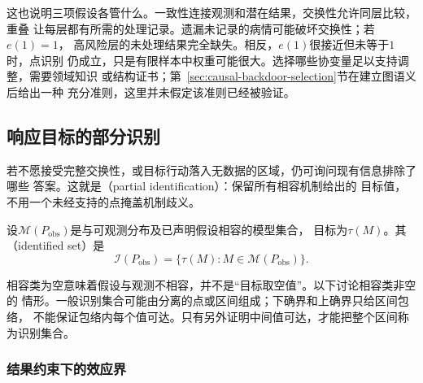 这也说明三项假设各管什么。一致性连接观测和潜在结果，交换性允许同层比较，重叠
让每层都有所需的处理记录。遗漏未记录的病情可能破坏交换性；若\(e(1)=1\)，
高风险层的未处理结果完全缺失。相反，\(e(1)\)很接近但未等于\(1\)时，点识别
仍成立，只是有限样本中权重可能很大。选择哪些协变量足以支持调整，需要领域知识
或结构证书；第~\ref{sec:causal-backdoor-selection}节在建立图语义后给出一种
充分准则，这里并未假定该准则已经被验证。

\subsection{响应目标的部分识别}
\label{sec:causal-partial-identification-sensitivity}

若不愿接受完整交换性，或目标行动落入无数据的区域，仍可询问现有信息排除了哪些
答案。这就是（partial identification）：保留所有相容机制给出的
目标值，不用一个未经支持的点掩盖机制歧义。
\begin{definition}[识别集合]
  \label{def:causal-identified-set}
  设\(\mathcal M(P_{\mathrm{obs}})\)是与可观测分布及已声明假设相容的模型集合，
  目标为\(\tau(M)\)。其（identified set）是
  \begin{equation}
    \mathcal I(P_{\mathrm{obs}})
    =\{\tau(M):M\in\mathcal M(P_{\mathrm{obs}})\}.
    \label{eq:causal-identified-set}
  \end{equation}
\end{definition}
相容类为空意味着假设与观测不相容，并不是“目标取空值”。以下讨论相容类非空的
情形。一般识别集合可能由分离的点或区间组成；下确界和上确界只给区间包络，
不能保证包络内每个值可达。只有另外证明中间值可达，才能把整个区间称为识别集合。

\subsubsection{结果约束下的效应界}
\label{sec:causal-outcome-bounds}

